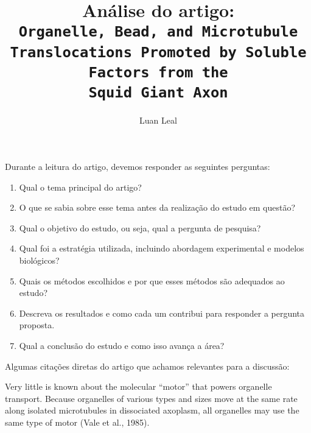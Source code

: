 \documentclass{article}
\author{Luan Leal}
\title{Análise do artigo:\\
    \texttt{Organelle, Bead, and Microtubule Translocations Promoted by Soluble Factors from the\\ Squid Giant Axon}
    }
\begin{document}
\maketitle

Durante a leitura do artigo, devemos responder as seguintes perguntas:
\begin{enumerate}
    \item Qual o tema principal do artigo?
    \item O que se sabia sobre esse tema antes da realização do estudo em questão? 
    \item Qual o objetivo do estudo, ou seja, qual a pergunta de pesquisa? 
    \item Qual foi a estratégia utilizada, incluindo abordagem experimental e modelos  biológicos? 
    \item Quais os métodos escolhidos e por que esses métodos são adequados ao estudo? 
    \item Descreva os resultados e como cada um contribui para responder a pergunta proposta.
    \item Qual a conclusão do estudo e como isso avança a área?  
\end{enumerate}

Algumas citações diretas do artigo que achamos relevantes para a discussão:
\begin{displayquote}
    Very little is known about the molecular “motor” that powers organelle transport. Because organelles of various types and sizes move at the same rate along isolated microtubules in dissociated axoplasm, all organelles may use the same type of motor (Vale et al., 1985). 
\end{displayquote}
\end{document}
